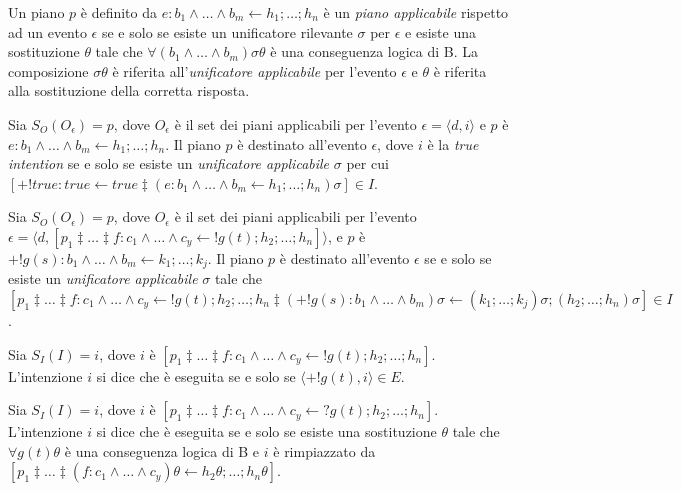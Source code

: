 \smallskip
\begin{defn}
Un piano $p$ è definito da $e : b_1 \land \ldots \land b_m \leftarrow h_1; \ldots; h_n$ è un \textit{piano applicabile} rispetto ad un evento $\epsilon$ se e solo se esiste un unificatore rilevante $\sigma$ per $\epsilon$ e esiste una sostituzione $\theta$ tale che $\forall (b_1 \land \ldots \land b_m) \sigma\theta$ è una conseguenza logica di B. La composizione $\sigma\theta$ è riferita all'\textit{unificatore applicabile} per l'evento $\epsilon$ e $\theta$ è riferita alla sostituzione della corretta risposta.
\end{defn}

\smallskip
\begin{defn}
Sia $S_O(O_\epsilon) = p$, dove $O_\epsilon$ è il set dei piani applicabili per l'evento $\epsilon = \langle d, i \rangle$ e $p$ è $e : b_1 \land \ldots \land b_m \leftarrow h_1; \ldots; h_n$. Il piano $p$ è destinato all'evento $\epsilon$, dove $i$ è la \textit{true intention} se e solo se esiste un \textit{unificatore applicabile} $\sigma$ per cui $[+!true : true \leftarrow true \ddagger (e : b_1 \land \ldots \land b_m \leftarrow h_1; \ldots; h_n) \sigma] \in I$.
\end{defn}

\smallskip
\begin{defn}
Sia $S_O(O_\epsilon) = p$, dove $O_\epsilon$ è il set dei piani applicabili per l'evento $\epsilon = \langle d, [p_1 \ddagger \ldots \ddagger f : c_1 \land \ldots \land c_y \leftarrow !g(t); h_2; \ldots; h_n] \rangle$, e $p$ è $+!g(s) : b_1 \land \ldots \land b_m \leftarrow k_1; \ldots; k_j$. Il piano $p$ è destinato all'evento $\epsilon$ se e solo se esiste un \textit{unificatore applicabile} $\sigma$ tale che $[p_1 \ddagger \ldots \ddagger f : c_1 \land \ldots \land c_y \leftarrow !g(t); h_2; \ldots; h_n \ddagger (+!g(s) : b_1 \land \ldots \land b_m) \sigma \leftarrow (k_1; \ldots; k_j) \sigma; (h_2; \ldots; h_n) \sigma] \in I$.
\end{defn}

\smallskip
\begin{defn}
Sia $S_I(I) = i$, dove $i$ è $[p_1 \ddagger \ldots \ddagger f : c_1 \land \ldots \land c_y \leftarrow !g(t);h_2; \ldots; h_n]$. L'intenzione $i$ si dice che è eseguita  se e solo se $\langle +!g(t), i \rangle \in E$.
\end{defn}

\smallskip
\begin{defn}
Sia $S_I(I) = i$, dove $i$ è $[p_1 \ddagger \ldots \ddagger f : c_1 \land \ldots \land c_y \leftarrow ?g(t); h_2; \ldots; h_n]$. L'intenzione $i$ si dice che è eseguita  se e solo se esiste una sostituzione $\theta$ tale che $\forall g(t) \theta$ è una conseguenza logica di B e $i$ è rimpiazzato da $[p_1 \ddagger \ldots \ddagger (f : c_1 \land \ldots \land c_y) \theta \leftarrow h_2 \theta; \ldots; h_n \theta]$.
\end{defn}

